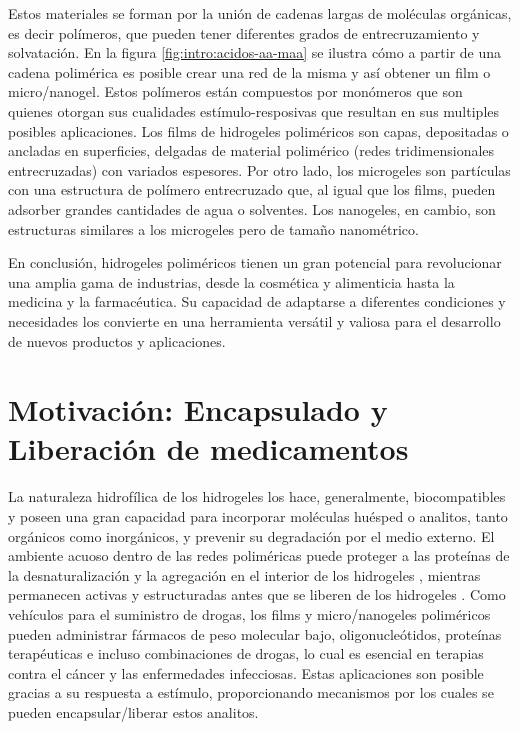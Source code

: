 Estos materiales se forman por la uni\'on de cadenas largas de mol\'eculas org\'anicas, es decir pol\'imeros, que pueden tener diferentes grados de entrecruzamiento y solvataci\'on. En la figura \ref{fig:intro:acidos-aa-maa} se ilustra c\'omo a partir de una cadena polim\'erica es posible crear una red de la misma y as\'i obtener un film o micro/nanogel. Estos pol\'imeros est\'an compuestos por mon\'omeros que son quienes otorgan sus cualidades est\'imulo-resposivas que resultan en sus multiples posibles aplicaciones.
Los films de hidrogeles polim\'ericos son capas, depositadas o ancladas en superficies, delgadas de material polim\'erico (redes tridimensionales entrecruzadas) con variados espesores. Por otro lado, los microgeles son part\'iculas con una estructura de pol\'imero entrecruzado que, al igual que los films, pueden adsorber grandes cantidades de agua o solventes. Los nanogeles, en cambio, son estructuras similares a los microgeles pero de tama\~no nanom\'etrico.

En conclusi\'on, hidrogeles polim\'ericos tienen un gran potencial para revolucionar una amplia gama de industrias, desde la cosm\'etica y alimenticia hasta la medicina y la farmac\'eutica. Su capacidad de adaptarse a diferentes condiciones y necesidades los convierte en una herramienta vers\'atil y valiosa para el desarrollo de nuevos productos y aplicaciones.




\section{Motivaci\'on: Encapsulado y Liberaci\'on de medicamentos}

La naturaleza hidrof\'ilica de los hidrogeles los hace, generalmente, biocompatibles y poseen una gran capacidad para incorporar mol\'eculas hu\'esped o analitos, tanto org\'anicos como inorg\'anicos, y prevenir su degradaci\'on por el medio externo.
El ambiente acuoso dentro de las redes polim\'ericas puede proteger a las prote\'inas de la desnaturalizaci\'on y la agregaci\'on en el interior de los hidrogeles \cite{asayama2008comparison,sawada2010nano,beierle2014polymer}, mientras permanecen activas y estructuradas antes que se liberen de los hidrogeles \cite{vermonden2012hydrogels}. 
Como veh\'iculos para el suministro de drogas, los films y micro/nanogeles polim\'ericos pueden administrar f\'armacos de peso molecular bajo, oligonucle\'otidos, prote\'inas terap\'euticas e incluso combinaciones de drogas, lo cual es esencial en terapias contra el c\'ancer y las enfermedades infecciosas.
Estas aplicaciones son posible gracias a su respuesta a est\'imulo,  proporcionando mecanismos por los cuales se pueden encapsular/liberar estos analitos.


